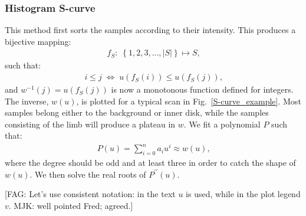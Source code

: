 \documentclass{aa}
\newcommand{\fag}[1]{\textcolor{midpurple}{[FAG: #1]}} %
\newcommand{\eqnl}[2]{\begin{eqnarray}\label{#1}#2\end{eqnarray}}
\begin{document}
\subsubsection{Histogram S-curve}


This method first sorts the samples according to their intensity. This produces a bijective mapping:
\eqnl{scurve-mapping1}{
f_S:\; \left\{ 1, 2, 3, ..., |S| \right\} \mapsto S \text{,}
}
such that:
\eqnl{scurve-mapping2}{
i \le j \; \Leftrightarrow \; u \left( f_S(i) \right) \le u \left( f_S(j) \right) \text{,} 
}
and $w^{-1}(j) = u(f_S(j))$ is now a monotonous function defined for integers. The inverse, $w(u)$, is plotted for a typical scan in 
Fig.~\ref{S-curve_example}. 
Most samples belong either to the background or inner disk, while the samples consisting of the limb will produce a plateau in $w$.
We fit a polynomial $P$ such that:
\eqnl{scurve-approx}{
P(u) = \sum \limits_{i=0}^{n} a_i u^i \approx w(u) \text{,}
}
where the degree should be odd and at least three in order to catch the shape of $w(u)$. We then solve the real roots of $P^{\prime\prime}(u)$.

\fag{Let's use consistent notation: in the text $u$ is used, while in the plot legend $v$. MJK: well pointed Fred; agreed.}
\end{document}
